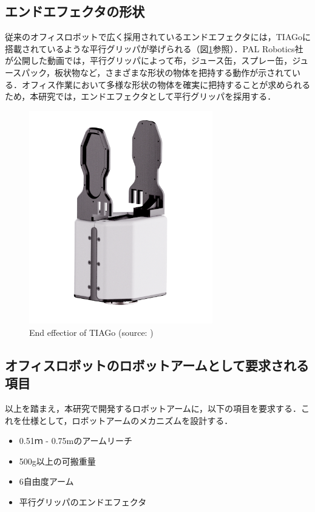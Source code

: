 \subsection{エンドエフェクタの形状}
従来のオフィスロボットで広く採用されているエンドエフェクタには，TIAGoに搭載されているような平行グリッパが挙げられる（図\ref{fig:tiago_hand}参照）．PAL Robotics社が公開した動画\cite{TIAGo-movie:online}では，平行グリッパによって布，ジュース缶，スプレー缶，ジュースパック，板状物など，さまざまな形状の物体を把持する動作が示されている．オフィス作業において多様な形状の物体を確実に把持することが求められるため，本研究では，エンドエフェクタとして平行グリッパを採用する．
\begin{figure}[h]
  \centering
  \includegraphics[width=8cm]{images/2syou/tiago_hand.png}
  \caption[End effectior of TIAGo]{End effectior of TIAGo (source: \cite{TIAGo:online})}
  \label{fig:tiago_hand}
\end{figure}
\clearpage

\subsection{オフィスロボットのロボットアームとして要求される項目}
以上を踏まえ，本研究で開発するロボットアームに，以下の項目を要求する．これを仕様として，ロボットアームのメカニズムを設計する．
\begin{itemize}
  \item 0.51ｍ - 0.75mのアームリーチ
  \item 500g以上の可搬重量
  \item 6自由度アーム
  \item 平行グリッパのエンドエフェクタ
\end{itemize}
\newpage